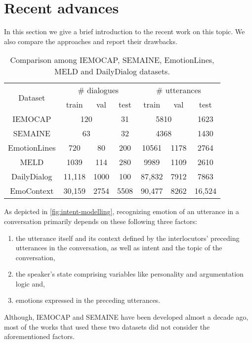 \documentclass{IEEEtran}\usepackage[pdftex]{graphicx}
\begin{document}
	\section{Recent advances}
	\label{sec:benchmarks}
	In this section we give a brief introduction to the recent work on this topic. We also compare the approaches and report their drawbacks.
	\begin{table*}[h!]
		\centering
		\begin{tabular}{c|c|c|c|c|c|c}
			\toprule
			\multirow{2}{*}{Dataset}&\multicolumn{3}{c|}{$\#$ dialogues}&\multicolumn{3}{c}{$\#$ utterances}\\
			&train&val&test&train&val&test\\
			\hline \hline
			IEMOCAP&\multicolumn{2}{c|}{120}&31&\multicolumn{2}{c|}{5810}&1623\\
			SEMAINE&\multicolumn{2}{c|}{63}&32&\multicolumn{2}{c|}{4368}&1430\\
			EmotionLines&720&80&200&10561&1178&2764\\
			MELD&1039&114&280& 9989& 1109& 2610\\
			DailyDialog&11,118&1000&100&87,832&7912&7863\\
			EmoContext&30,159&2754&5508&90,477&8262&16,524\\
			\bottomrule
		\end{tabular}
		\caption{Comparison among IEMOCAP, SEMAINE, EmotionLines, MELD and DailyDialog datasets.}
		\label{table:data}
	\end{table*}
	
	As depicted in \cref{fig:intent-modelling}, recognizing emotion of an utterance in a conversation primarily depends on these following three factors: 
	\begin{enumerate}
		\item the utterance itself and its context defined by the interlocutors' preceding utterances in the conversation, as well as intent and the topic of the conversation,
		\item the speaker's state comprising variables like personality and argumentation logic and,
		\item emotions expressed in the preceding utterances.
	\end{enumerate}
	Although, IEMOCAP and SEMAINE have been developed almost a decade ago, most of the works that used these two datasets did not consider the aforementioned factors.
\end{document}
